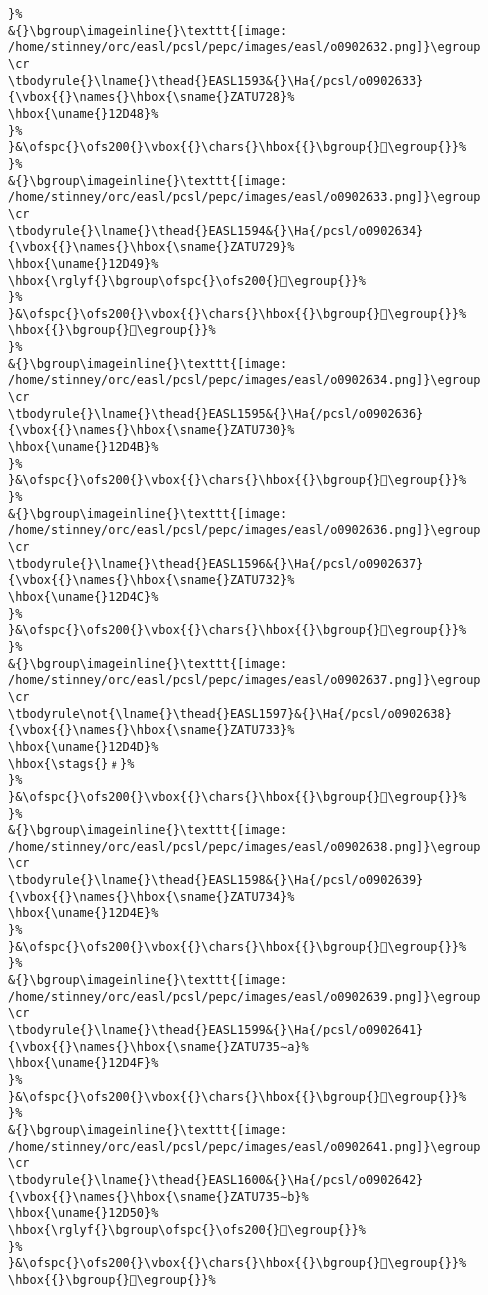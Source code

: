 \begin{verbatim}
}%
&{}\bgroup\imageinline{}\texttt{[image: /home/stinney/orc/easl/pcsl/pepc/images/easl/o0902632.png]}\egroup
\cr
\tbodyrule{}\lname{}\thead{}EASL1593&{}\Ha{/pcsl/o0902633}{\vbox{{}\names{}\hbox{\sname{}ZATU728}%
\hbox{\uname{}12D48}%
}%
}&\ofspc{}\ofs200{}\vbox{{}\chars{}\hbox{{}\bgroup{}𒵈\egroup{}}%
}%
&{}\bgroup\imageinline{}\texttt{[image: /home/stinney/orc/easl/pcsl/pepc/images/easl/o0902633.png]}\egroup
\cr
\tbodyrule{}\lname{}\thead{}EASL1594&{}\Ha{/pcsl/o0902634}{\vbox{{}\names{}\hbox{\sname{}ZATU729}%
\hbox{\uname{}12D49}%
\hbox{\rglyf{}\bgroup\ofspc{}\ofs200{}𒵉\egroup{}}%
}%
}&\ofspc{}\ofs200{}\vbox{{}\chars{}\hbox{{}\bgroup{}𒵉\egroup{}}%
\hbox{{}\bgroup{}𒵊\egroup{}}%
}%
&{}\bgroup\imageinline{}\texttt{[image: /home/stinney/orc/easl/pcsl/pepc/images/easl/o0902634.png]}\egroup
\cr
\tbodyrule{}\lname{}\thead{}EASL1595&{}\Ha{/pcsl/o0902636}{\vbox{{}\names{}\hbox{\sname{}ZATU730}%
\hbox{\uname{}12D4B}%
}%
}&\ofspc{}\ofs200{}\vbox{{}\chars{}\hbox{{}\bgroup{}𒵋\egroup{}}%
}%
&{}\bgroup\imageinline{}\texttt{[image: /home/stinney/orc/easl/pcsl/pepc/images/easl/o0902636.png]}\egroup
\cr
\tbodyrule{}\lname{}\thead{}EASL1596&{}\Ha{/pcsl/o0902637}{\vbox{{}\names{}\hbox{\sname{}ZATU732}%
\hbox{\uname{}12D4C}%
}%
}&\ofspc{}\ofs200{}\vbox{{}\chars{}\hbox{{}\bgroup{}𒵌\egroup{}}%
}%
&{}\bgroup\imageinline{}\texttt{[image: /home/stinney/orc/easl/pcsl/pepc/images/easl/o0902637.png]}\egroup
\cr
\tbodyrule\not{\lname{}\thead{}EASL1597}&{}\Ha{/pcsl/o0902638}{\vbox{{}\names{}\hbox{\sname{}ZATU733}%
\hbox{\uname{}12D4D}%
\hbox{\stags{}﹟}%
}%
}&\ofspc{}\ofs200{}\vbox{{}\chars{}\hbox{{}\bgroup{}𒵍\egroup{}}%
}%
&{}\bgroup\imageinline{}\texttt{[image: /home/stinney/orc/easl/pcsl/pepc/images/easl/o0902638.png]}\egroup
\cr
\tbodyrule{}\lname{}\thead{}EASL1598&{}\Ha{/pcsl/o0902639}{\vbox{{}\names{}\hbox{\sname{}ZATU734}%
\hbox{\uname{}12D4E}%
}%
}&\ofspc{}\ofs200{}\vbox{{}\chars{}\hbox{{}\bgroup{}𒵎\egroup{}}%
}%
&{}\bgroup\imageinline{}\texttt{[image: /home/stinney/orc/easl/pcsl/pepc/images/easl/o0902639.png]}\egroup
\cr
\tbodyrule{}\lname{}\thead{}EASL1599&{}\Ha{/pcsl/o0902641}{\vbox{{}\names{}\hbox{\sname{}ZATU735∼a}%
\hbox{\uname{}12D4F}%
}%
}&\ofspc{}\ofs200{}\vbox{{}\chars{}\hbox{{}\bgroup{}𒵏\egroup{}}%
}%
&{}\bgroup\imageinline{}\texttt{[image: /home/stinney/orc/easl/pcsl/pepc/images/easl/o0902641.png]}\egroup
\cr
\tbodyrule{}\lname{}\thead{}EASL1600&{}\Ha{/pcsl/o0902642}{\vbox{{}\names{}\hbox{\sname{}ZATU735∼b}%
\hbox{\uname{}12D50}%
\hbox{\rglyf{}\bgroup\ofspc{}\ofs200{}𒵐\egroup{}}%
}%
}&\ofspc{}\ofs200{}\vbox{{}\chars{}\hbox{{}\bgroup{}𒵒\egroup{}}%
\hbox{{}\bgroup{}𒵐\egroup{}}%

\end{verbatim}
